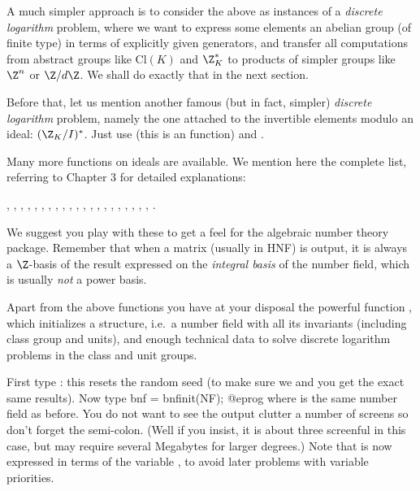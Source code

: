A much simpler approach is to consider the above as instances of a
\emph{discrete logarithm} problem, where we want to express some elements an
abelian group (of finite type) in terms of explicitly given generators, and
transfer all computations from abstract groups like $\text{Cl}(K)$ and
$\Z_K^*$ to products of simpler groups like $\Z^n$ or $\Z/d\Z$. We shall do
exactly that in the next section.

Before that, let us mention another famous (but in fact, simpler)
\emph{discrete logarithm} problem, namely the one attached to the
invertible elements modulo an ideal: $(\Z_K / I)^*$. Just use 
(this is an  function) and .

Many more functions on ideals are available. We mention here the complete
list, referring to Chapter 3 for detailed explanations:

, , , ,
, , , ,
, , , ,
, , , ,
, ,
, , ,
.

We suggest you play with these to get a feel for the algebraic number theory
package. Remember that when a matrix (usually in HNF) is output, it is always
a $\Z$-basis of the result expressed on the \emph{integral basis} 
of the number field, which is usually \emph{not} a power basis.


Apart from the above functions you have at your disposal the powerful
function , which initializes a  structure, i.e.~a
number field with all its invariants (including class group and units), and
enough technical data to solve discrete logarithm problems in the class and
unit groups.

First type : this resets the random seed (to make sure we
and you get the exact same results). Now type
\bprog
  bnf = bnfinit(NF);
@eprog\noindent
where  is the same number field as before. You do not want to see the
output clutter a number of screens so don't forget the semi-colon. (Well if
you insist, it is about three screenful in this case, but may require several
Megabytes for larger degrees.) Note that  is now expressed in terms
of the variable , to avoid later problems with variable priorities.

